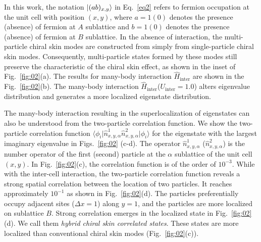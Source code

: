 \documentclass[longbibliography, aps, prx, amsmath, amssymb, amsfonts, twocolumn,superscriptaddress, footinbib]{revtex4-1}
\begin{document}
	In this work, the notation $\ket{(ab)_{x,y}}$ in Eq.~\ref{eq2} refers to fermion occupation at the unit cell with position $(x,y)$, where $a=1(0)$ denotes the presence (absence) of fermion at $A$ sublattice and $b=1(0)$ denotes the presence (absence) of fermion at $B$ sublattice.
	In the absence of interaction, the multi-particle chiral skin modes are constructed from simply from single-particle chiral skin modes. Consequently, multi-particle states formed by these modes still preserve the characteristic of the chiral skin effect, as shown in the inset of Fig.~\ref{fig:02}(a).
	The results for many-body interaction $\hat{H}_{\text{inter}}$ are shown in the Fig.~\ref{fig:02}(b). The many-body interaction $\hat{H}_{\text{inter}}$($U_{\text{inter}}=1.0$) alters eigenvalue distribution and generates a more localized eigenstate distribution. 

	The many-body interaction resulting in the superlocalization of eigenstates can also be understood from the two-particle correlation function. 
	We show the two-particle correlation function $\langle \phi_i \vert \hat{n}^1_{x,y,\alpha} \hat{n}^2_{x,y,\alpha} \vert \phi_i \rangle$ for the eigenstate with the largest imaginary eigenvalue in Figs.~\ref{fig:02} (c-d). The operator $\hat{n}^1_{x,y,\alpha}$ ($\hat{n}^2_{x,y,\alpha}$) is the number operator of the first (second) particle at the $\alpha$ sublattice of the unit cell $(x,y)$.
	In Fig.~\ref{fig:02}(c), the correlation function is of the order of $10^{-3}$. While with the inter-cell interaction, the two-particle correlation function reveals a strong spatial correlation between the location of two particles. It reaches approximately $10^{-1}$ as shown in Fig.~\ref{fig:02}(d).
	The particles preferentially occupy adjacent sites ($\Delta x =1$) along $y=1$, and the particles are more localized on sublattice $B$. 
	Strong correlation emerges in the localized state in Fig.~\ref{fig:02}(d).  We call them \textit{hybrid chiral skin correlated states}. These states are more localized than conventional chiral skin modes (Fig.~\ref{fig:02}(c)).
	
\end{document}
